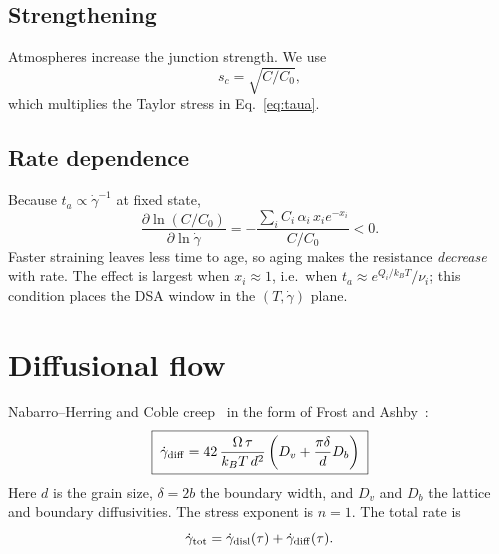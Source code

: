 \documentclass[11pt]{article}
\newcommand{\gd}{\dot\gamma}
\newcommand{\kT}{k_BT}
\numberwithin{equation}{section}
\begin{document}
\subsection{Strengthening}
Atmospheres increase the junction strength. We use~\cite{Cheng2001}
\begin{equation}
s_c=\sqrt{C/C_0},
\end{equation}
which multiplies the Taylor stress in Eq.~\eqref{eq:taua}.

\subsection{Rate dependence}
Because $t_a\propto\gd^{-1}$ at fixed state,
\begin{equation}
\frac{\partial\ln(C/C_0)}{\partial\ln\gd}=-\frac{\sum_iC_i\,\alpha_i\,x_ie^{-x_i}}{C/C_0}<0 .
\label{eq:aging_slope}
\end{equation}
Faster straining leaves less time to age, so aging makes the resistance \emph{decrease} with rate. The effect is largest when $x_i\approx1$, i.e.\ when $t_a\approx e^{Q_i/\kT}/\nu_i$; this condition places the DSA window in the $(T,\gd)$ plane.

\section{Diffusional flow}
\label{sec:diff}
Nabarro--Herring and Coble creep~\cite{Nabarro1948,Herring1950,Coble1963} in the form of Frost and Ashby~\cite{FrostAshby}:
\begin{equation}
\boxed{\;\gd_{\rm diff}=42\,\frac{\Omega\,\tau}{\kT\,d^2}\left(D_v+\frac{\pi\delta}{d}D_b\right)\;}
\label{eq:diff}
\end{equation}
Here $d$ is the grain size, $\delta=2b$ the boundary width, and $D_v$ and $D_b$ the lattice and boundary diffusivities. The stress exponent is $n=1$. The total rate is
\begin{equation}
\gd_{\rm tot}=\gd_{\rm disl}(\tau)+\gd_{\rm diff}(\tau).
\end{equation}

\end{document}
